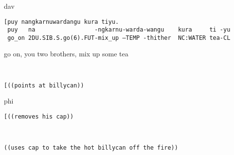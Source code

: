 \documentclass[output=paper,nonflat,colorlinks,citecolor=brown]{langsci/langscibook}
\begin{document}
\vspace{-1mm}
%
\begin{mdframednoverticalspace}[style=firstfoc]
\begin{transbox}{1}{dav}
\begin{verbatim}
[puy nangkarnuwardangu kura tiyu.
 puy   na                 -ngkarnu-warda-wangu    kura     ti -yu
 go_on 2DU.SIB.S.go(6).FUT-mix_up –TEMP -thither  NC:WATER tea-CL
\end{verbatim}
\hspace{0.07cm} go on, you two brothers, mix up some tea
\end{transbox}
\end{mdframednoverticalspace}
%
\begin{mdframednoverticalspace}[style=firstfoc]
\begin{transbox}{2}{~}
\begin{verbatim}
[((points at billycan))
\end{verbatim}
\end{transbox}
\end{mdframednoverticalspace}
%
\begin{transbox}{3}{phi}
\begin{verbatim}
[((removes his cap))
\end{verbatim}
\end{transbox}\vspace{-1mm}
%
\begin{mdframednoverticalspace}[style=secondfoc]
\begin{transbox}{4}{~}
\begin{verbatim}
((uses cap to take the hot billycan off the fire))
\end{verbatim}
\end{transbox}
\end{mdframednoverticalspace}
\end{document}
